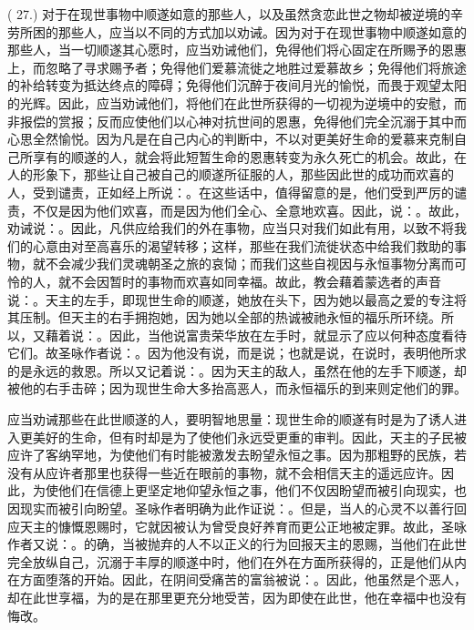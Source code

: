 ( 27.) 对于在现世事物中顺遂如意的那些人，以及虽然贪恋此世之物却被逆境的辛劳所困的那些人，应当以不同的方式加以劝诫。因为对于在现世事物中顺遂如意的那些人，当一切顺遂其心愿时，应当劝诫他们，免得他们将心固定在所赐予的恩惠上，而忽略了寻求赐予者；免得他们爱慕流徙之地胜过爱慕故乡；免得他们将旅途的补给转变为抵达终点的障碍；免得他们沉醉于夜间月光的愉悦，而畏于观望太阳的光辉。因此，应当劝诫他们，将他们在此世所获得的一切视为逆境中的安慰，而非报偿的赏报；反而应使他们以心神对抗世间的恩惠，免得他们完全沉溺于其中而心思全然愉悦。因为凡是在自己内心的判断中，不以对更美好生命的爱慕来克制自己所享有的顺遂的人，就会将此短暂生命的恩惠转变为永久死亡的机会。故此，在人的形象下，那些让自己被自己的顺遂所征服的人，那些因此世的成功而欢喜的人，受到谴责，正如经上所说：。在这些话中，值得留意的是，他们受到严厉的谴责，不仅是因为他们欢喜，而是因为他们全心、全意地欢喜。因此，说：。故此，劝诫说：。因此，凡供应给我们的外在事物，应当只对我们如此有用，以致不将我们的心意由对至高喜乐的渴望转移；这样，那些在我们流徙状态中给我们救助的事物，就不会减少我们灵魂朝圣之旅的哀恸；而我们这些自视因与永恒事物分离而可怜的人，就不会因暂时的事物而欢喜如同幸福。故此，教会藉着蒙选者的声音说：。天主的左手，即现世生命的顺遂，她放在头下，因为她以最高之爱的专注将其压制。但天主的右手拥抱她，因为她以全部的热诚被祂永恒的福乐所环绕。所以，又藉着说：。因此，当他说富贵荣华放在左手时，就显示了应以何种态度看待它们。故圣咏作者说：。因为他没有说，而是说；也就是说，在说时，表明他所求的是永远的救恩。所以又记着说：。因为天主的敌人，虽然在他的左手下顺遂，却被他的右手击碎；因为现世生命大多抬高恶人，而永恒福乐的到来则定他们的罪。\par

应当劝诫那些在此世顺遂的人，要明智地思量：现世生命的顺遂有时是为了诱人进入更美好的生命，但有时却是为了使他们永远受更重的审判。因此，天主的子民被应许了客纳罕地，为使他们有时能被激发去盼望永恒之事。因为那粗野的民族，若没有从应许者那里也获得一些近在眼前的事物，就不会相信天主的遥远应许。因此，为使他们在信德上更坚定地仰望永恒之事，他们不仅因盼望而被引向现实，也因现实而被引向盼望。圣咏作者明确为此作证说：。但是，当人的心灵不以善行回应天主的慷慨恩赐时，它就因被认为曾受良好养育而更公正地被定罪。故此，圣咏作者又说：。的确，当被抛弃的人不以正义的行为回报天主的恩赐，当他们在此世完全放纵自己，沉溺于丰厚的顺遂中时，他们在外在方面所获得的，正是他们从内在方面堕落的开始。因此，在阴间受痛苦的富翁被说：。因此，他虽然是个恶人，却在此世享福，为的是在那里更充分地受苦，因为即使在此世，他在幸福中也没有悔改。\par

